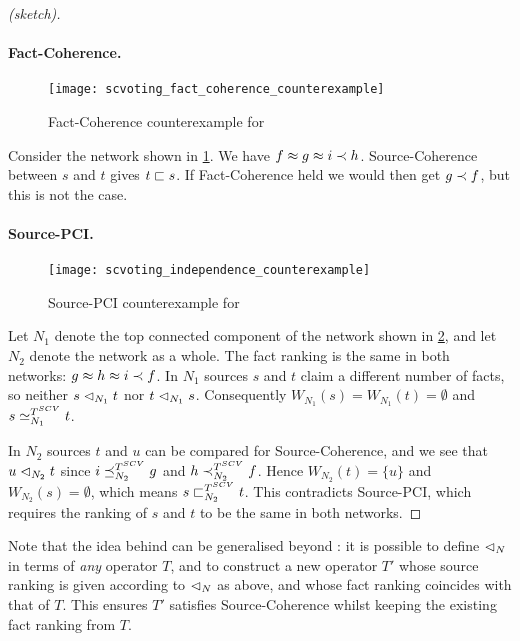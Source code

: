 \begin{proof}[ (sketch)]
\paragraph{Fact-Coherence.}

\begin{figure}
    \centering
    \texttt{[image: scvoting\_fact\_coherence\_counterexample]}
    \caption{
        Fact-Coherence counterexample for \scvoting{}
    }
    \label{td_fig_scvoting_fact_coherence_counterexample}
\end{figure}

Consider the network shown in
\cref{td_fig_scvoting_fact_coherence_counterexample}. We have $f \approx g \approx i
\prec h$. Source-Coherence between $s$ and $t$ gives $t \sqsubset s$. If
Fact-Coherence held we would then get $g \prec f$, but this is not the case.

\paragraph{Source-PCI.}

\begin{figure}
    \centering
    \texttt{[image: scvoting\_independence\_counterexample]}
    \caption{
        Source-PCI counterexample for \scvoting{}
    }
    \label{td_fig_scvoting_independence_counterexample}
\end{figure}

Let $N_1$ denote the top connected component of the network shown in
\cref{td_fig_scvoting_independence_counterexample}, and let $N_2$ denote the
network as a whole. The fact ranking is the same in both networks: $g \approx h
\approx i \prec f$.  In $N_1$ sources $s$ and $t$ claim a different number of
facts, so neither $s \mathrel{\lhd}_{N_1} t$ nor $t \mathrel{\lhd}_{N_1} s$. Consequently
$W_{N_1}(s) = W_{N_1}(t) = \emptyset$ and $s \simeq_{N_1}^{T^{SCV}} t$.

In $N_2$ sources $t$ and $u$ can be compared for Source-Coherence, and we see
that $u \mathrel{\lhd}_{N_2} t$ since $i \preceq_{N_2}^{T^{SCV}} g$ and $h
\prec_{N_2}^{T^{SCV}} f$. Hence $W_{N_2}(t) = \{u\}$ and $W_{N_2}(s) =
\emptyset$, which means $s \sqsubset_{N_2}^{T^{SCV}} t$. This contradicts
Source-PCI, which requires the ranking of $s$ and $t$ to be the same in both
networks.  \end{proof}

Note that the idea behind \scvoting{} can be generalised
beyond \voting{}: it is possible to define $\mathrel{\lhd}_N$ in terms of \emph{any}
operator $T$, and to construct a new operator $T'$ whose source ranking is
given according to $\mathrel{\lhd}_N$ as above, and whose fact ranking coincides with
that of $T$. This ensures $T'$ satisfies Source-Coherence whilst keeping the
existing fact ranking from $T$.

